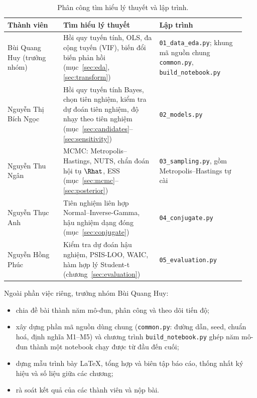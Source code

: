 \documentclass[12pt,a4paper]{report}
\begin{document}
\begin{table}[htbp]
  \centering
  \small
  \caption{Phân công tìm hiểu lý thuyết và lập trình.}
  \label{tab:roles}
  \begin{tabular}{@{}>{\raggedright\arraybackslash}p{0.22\linewidth}>{\raggedright\arraybackslash}p{0.38\linewidth}>{\raggedright\arraybackslash}p{0.34\linewidth}@{}}
    \toprule
    Thành viên & Tìm hiểu lý thuyết & Lập trình \\
    \midrule
    Bùi Quang Huy \newline 25007877 \newline (trưởng nhóm)
      & Hồi quy tuyến tính, OLS, đa cộng tuyến (VIF), biến đổi biến phản hồi
        (mục~\ref{sec:eda}, \ref{sec:transform})
      & \texttt{01\_data\_eda.py}; khung mã nguồn chung \texttt{common.py},
        \texttt{build\_notebook.py} \\
    \addlinespace
    Nguyễn Thị Bích Ngọc \newline 25007937
      & Hồi quy tuyến tính Bayes, chọn tiên nghiệm, kiểm tra dự đoán tiên
        nghiệm, độ nhạy theo tiên nghiệm (mục~\ref{sec:candidates}--\ref{sec:sensitivity})
      & \texttt{02\_models.py} \\
    \addlinespace
    Nguyễn Thu Ngân \newline 25007865
      & MCMC: Metropolis--Hastings, NUTS, chẩn đoán hội tụ $\Rhat$, ESS
        (mục~\ref{sec:mcmc}--\ref{sec:posterior})
      & \texttt{03\_sampling.py}, gồm Metropolis--Hastings tự cài \\
    \addlinespace
    Nguyễn Thục Anh \newline 25007949
      & Tiên nghiệm liên hợp Normal--Inverse-Gamma, hậu nghiệm dạng đóng
        (mục~\ref{sec:conjugate})
      & \texttt{04\_conjugate.py} \\
    \addlinespace
    Nguyễn Hồng Phúc \newline 25007860
      & Kiểm tra dự đoán hậu nghiệm, PSIS-LOO, WAIC, hàm hợp lý Student-t
        (chương~\ref{sec:evaluation})
      & \texttt{05\_evaluation.py} \\
    \bottomrule
  \end{tabular}
\end{table}

Ngoài phần việc riêng, trưởng nhóm Bùi Quang Huy:

\begin{itemize}
  \item chia đề bài thành năm mô-đun, phân công và theo dõi tiến độ;
  \item xây dựng phần mã nguồn dùng chung (\texttt{common.py}: đường dẫn, seed,
    chuẩn hoá, định nghĩa M1--M5) và chương trình \texttt{build\_notebook.py} ghép
    năm mô-đun thành một notebook chạy được từ đầu đến cuối;
  \item dựng mẫu trình bày LaTeX, tổng hợp và biên tập báo cáo, thống nhất ký
    hiệu và số liệu giữa các chương;
  \item rà soát kết quả của các thành viên và nộp bài.
\end{itemize}
\end{document}
